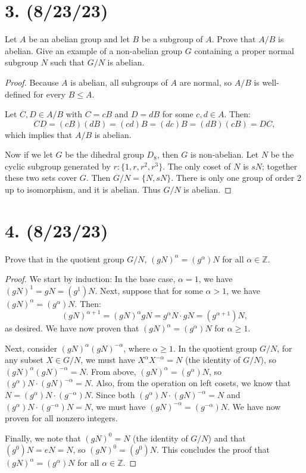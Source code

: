 \documentclass{article}
\begin{document}
\section*{3. (8/23/23)}

Let $A$ be an abelian group and let $B$ be a subgroup of $A$. Prove that $A/B$ is abelian. Give an example of a non-abelian group $G$ containing a proper normal subgroup $N$ such that $G/N$ is abelian.

\begin{proof}
    Because $A$ is abelian, all subgroups of $A$ are normal, so $A/B$ is well-defined for every $B \leq A$.

    Let $C, D \in A/B$ with $C = cB$ and $D = dB$ for some $c, d \in A$. Then:
    \begin{equation*}
        CD = (cB)(dB) = (cd)B = (dc)B = (dB)(cB) = DC,
    \end{equation*}
    which implies that $A/B$ is abelian.

    Now if we let $G$ be the dihedral group $D_8$, then $G$ is non-abelian. Let $N$ be the cyclic subgroup generated by $r: \{ 1, r, r^2, r^3 \}$. The only coset of $N$ is $sN$; together these two sets cover $G$. Then $G/N = \{ N, sN \}$. There is only one group of order 2 up to isomorphism, and it is abelian. Thus $G/N$ is abelian.
\end{proof}

\section*{4. (8/23/23)}

Prove that in the quotient group $G/N$, $(gN)^\alpha = (g^\alpha)N$ for all $\alpha \in \mathbb{Z}$.

\begin{proof}
    We start by induction: In the base case, $\alpha = 1$, we have $(gN)^1 = gN = (g^1)N$. Next, suppose that for some $\alpha > 1$, we have $(gN)^\alpha = (g^\alpha)N$. Then:
    \begin{equation*}
        (gN)^{\alpha + 1} = (gN)^\alpha gN = g^\alpha N \cdot gN = (g^{\alpha + 1})N,
    \end{equation*}
    as desired. We have now proven that $(gN)^\alpha = (g^\alpha)N$ for $\alpha \geq 1$.

    Next, consider $(gN)^\alpha (gN)^{-\alpha}$, where $\alpha \geq 1$. In the quotient group $G/N$, for any subset $X \in G/N$, we must have $X^\alpha X^{-\alpha} = N$ (the identity of $G/N$), so $(gN)^\alpha (gN)^{-\alpha} = N$. From above, $(gN)^\alpha = (g^\alpha)N$, so $(g^\alpha)N \cdot (gN)^{-\alpha} = N$. Also, from the operation on left cosets, we know that $N = (g^\alpha)N \cdot (g^{-\alpha})N$. Since both $(g^\alpha)N \cdot (gN)^{-\alpha} = N$ and $(g^\alpha)N \cdot (g^{-\alpha})N = N$, we must have $(gN)^{-\alpha} = (g^{-\alpha})N$. We have now proven for all nonzero integers.

    Finally, we note that $(gN)^0 = N$ (the identity of $G/N$) and that $(g^0)N = eN = N$, so $(gN)^0 = (g^0)N$. This concludes the proof that $(gN)^\alpha = (g^\alpha)N$ for all $\alpha \in \mathbb{Z}$.
\end{proof}
\end{document}
